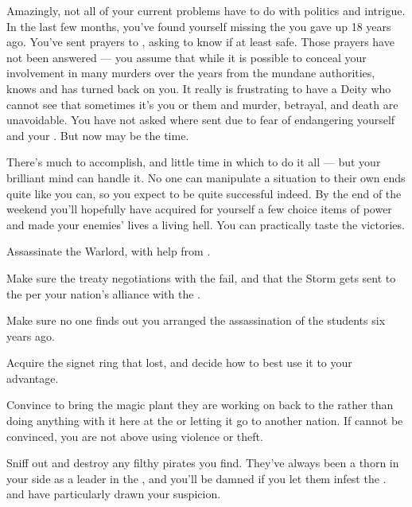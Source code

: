 \documentclass[char]{GL2020}
\begin{document}
Amazingly, not all of your current problems have to do with politics and intrigue. In the last few months, you've found yourself missing the \cPirateChild{\child} you gave up 18 years ago. You've sent prayers to \cFarmGod{}, asking to know if \cPirateChild{\theyare} at least safe. Those prayers have not been answered — you assume that while it is possible to conceal your involvement in many murders over the years from the mundane authorities, \cFarmGod{} knows and has turned \cFarmGod{\their} back on you. It really is frustrating to have a Deity who cannot see that sometimes it's you or them and murder, betrayal, and death are unavoidable. You have not asked \cEthics{} where \cEthics{\they} sent \cPirateChild{\them} due to fear of endangering yourself and your \cPirateChild{\child}.  But now may be the time.  

There's much to accomplish, and little time in which to do it all — but your brilliant mind can handle it. No one can manipulate a situation to their own ends quite like you can, so you expect to be quite successful indeed. By the end of the weekend you'll hopefully have acquired for yourself a few choice items of power and made your enemies’ lives a living hell. You can practically taste the victories.

\begin{itemz}
    \item Assassinate the \pShippies{} Warlord, \cLoud{\full} with help from \cDiplomat{}.
    \item Make sure the treaty negotiations with the \pShip{} fail, and that the Storm gets sent to the \pShip{} per your nation's alliance with the \pTech{}.
    \item Make sure no one finds out you arranged the assassination of the students six years ago.
    \item Acquire the \pFarm{} signet ring that \cPrince{} lost, and decide how to best use it to your advantage.
    \item Convince  \cCurse{} to bring the magic plant they are working on back to the \pFarm{} rather than doing anything with it here at the \pSchool{} or letting it go to another nation. If \cCurse{} cannot be convinced, you are not above using violence or theft.    \item Sniff out and destroy any filthy pirates you find. They've always been a thorn in your side as a leader in the \pFarm{}, and you'll be damned if you let them infest the \pSc{}. \cPirateChild{} and \cJuniorStatesman{} have particularly drawn your suspicion.
\end{itemz}
\end{document}
